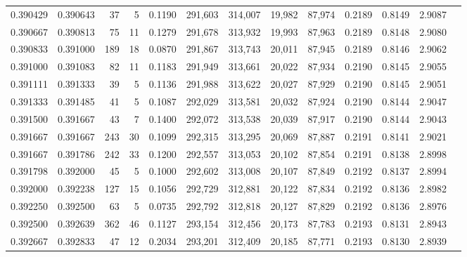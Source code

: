 \begin{tabular}{rrrrrrrrrrrrr}
0.390429 & 0.390643 &    37 &   5 &                                     0.1190 & 291,603 & 314,007 &  19,982 &  87,974 & 0.2189 & 0.8149 & 2.9087 \\
0.390667 & 0.390813 &    75 &  11 &                                     0.1279 & 291,678 & 313,932 &  19,993 &  87,963 & 0.2189 & 0.8148 & 2.9080 \\
0.390833 & 0.391000 &   189 &  18 &                                     0.0870 & 291,867 & 313,743 &  20,011 &  87,945 & 0.2189 & 0.8146 & 2.9062 \\
0.391000 & 0.391083 &    82 &  11 &                                     0.1183 & 291,949 & 313,661 &  20,022 &  87,934 & 0.2190 & 0.8145 & 2.9055 \\
0.391111 & 0.391333 &    39 &   5 &                                     0.1136 & 291,988 & 313,622 &  20,027 &  87,929 & 0.2190 & 0.8145 & 2.9051 \\
0.391333 & 0.391485 &    41 &   5 &                                     0.1087 & 292,029 & 313,581 &  20,032 &  87,924 & 0.2190 & 0.8144 & 2.9047 \\
0.391500 & 0.391667 &    43 &   7 &                                     0.1400 & 292,072 & 313,538 &  20,039 &  87,917 & 0.2190 & 0.8144 & 2.9043 \\
0.391667 & 0.391667 &   243 &  30 &                                     0.1099 & 292,315 & 313,295 &  20,069 &  87,887 & 0.2191 & 0.8141 & 2.9021 \\
0.391667 & 0.391786 &   242 &  33 &                                     0.1200 & 292,557 & 313,053 &  20,102 &  87,854 & 0.2191 & 0.8138 & 2.8998 \\
0.391798 & 0.392000 &    45 &   5 &                                     0.1000 & 292,602 & 313,008 &  20,107 &  87,849 & 0.2192 & 0.8137 & 2.8994 \\
0.392000 & 0.392238 &   127 &  15 &                                     0.1056 & 292,729 & 312,881 &  20,122 &  87,834 & 0.2192 & 0.8136 & 2.8982 \\
0.392250 & 0.392500 &    63 &   5 &                                     0.0735 & 292,792 & 312,818 &  20,127 &  87,829 & 0.2192 & 0.8136 & 2.8976 \\
0.392500 & 0.392639 &   362 &  46 &                                     0.1127 & 293,154 & 312,456 &  20,173 &  87,783 & 0.2193 & 0.8131 & 2.8943 \\
0.392667 & 0.392833 &    47 &  12 &                                     0.2034 & 293,201 & 312,409 &  20,185 &  87,771 & 0.2193 & 0.8130 & 2.8939 \\

\end{tabular}
